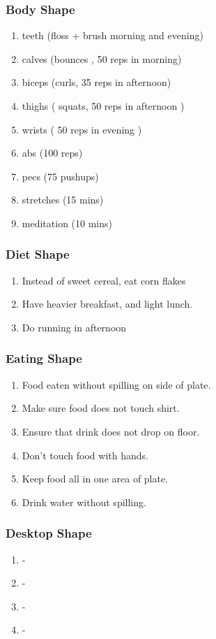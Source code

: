 \begin{frame} 
\frametitle{Body Shape} 
\begin{enumerate}
\item \small teeth (floss + brush morning and evening)
\item \small calves (bounces , 50 reps in morning)  
\item \small biceps (curls, 35 reps in afternoon) 
\item \small thighs ( squats, 50 reps in afternoon ) 
\item \small wrists ( 50 reps in evening )
\item \small abs  (100 reps)
\item \small pecs (75 pushups)
\item \small stretches (15 mins)
\item \small meditation (10 mins)
\end{enumerate}
\end{frame} 

\begin{frame} 
\frametitle{Diet Shape} 
\begin{enumerate}
\item \small Instead of sweet cereal, eat corn flakes
\item \small Have heavier breakfast, and light lunch. 
\item \small Do running in afternoon 
\end{enumerate}
\end{frame} 



\begin{frame} 
\frametitle{Eating Shape} 
\begin{enumerate}
\item \small Food eaten without spilling on side of plate. 
\item \small Make sure food does not touch shirt. 
\item \small Ensure that drink does not drop on floor. 
\item \small Don't touch food with hands. 
\item \small Keep food all in one area of plate.  
\item \small Drink water without spilling. 
\end{enumerate}
\end{frame} 

\begin{frame} 
\frametitle{Desktop Shape} 
\begin{enumerate} 
\item \small -
\item \small -
\item \small -
\item \small -
\end{enumerate}
\end{frame} 

